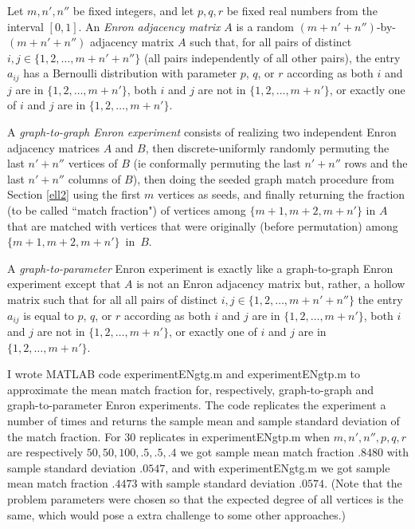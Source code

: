 \documentclass[12pt]{article}
\begin{document}
Let $m,n',n''$ be fixed integers, and let $p,q,r$ be fixed real numbers
from the interval $[0,1]$. An {\it Enron adjacency matrix} $A$ is a
random $(m+n'+n'')$-by-$(m+n'+n'')$ adjacency matrix $A$ such that, for
all pairs of distinct $i,j \in \{ 1,2,\ldots,m+n'+n''\}$
(all pairs independently of all other pairs), the entry
$a_{ij}$ has a Bernoulli distribution with parameter $p$, $q$, or $r$
according as both $i$ and $j$ are in $\{ 1,2,\ldots,m+n'\}$,
both $i$ and $j$ are not in $\{ 1,2,\ldots,m+n'\}$, or exactly one of $i$ and $j$
are in $\{ 1,2,\ldots,m+n'\}$.

A {\it graph-to-graph Enron experiment} consists
of realizing two independent Enron adjacency matrices $A$ and $B$, then  discrete-uniformly randomly permuting the last $n'+n''$ vertices of $B$
(ie conformally permuting the last $n'+n''$ rows and the last $n'+n''$
columns of $B$), then doing the seeded graph match procedure from
Section \ref{ell2} using the first $m$ vertices as seeds, and finally
returning the fraction (to be called ``match fraction")
of vertices among $\{ m+1,m+2,m+n' \}$ in $A$
that are matched with vertices that were originally (before permutation)
among $\{ m+1,m+2,m+n' \}$~in~$B$.


A {\it graph-to-parameter} Enron experiment is exactly like a
graph-to-graph Enron experiment except that $A$ is not an Enron
adjacency matrix but, rather, a hollow matrix such that for all
 all pairs of distinct $i,j \in \{ 1,2,\ldots,m+n'+n''\}$
the entry $a_{ij}$ is equal to $p$, $q$, or $r$
according as both $i$ and $j$ are in $\{ 1,2,\ldots,m+n'\}$,
both $i$ and $j$ are not in $\{ 1,2,\ldots,m+n'\}$, or exactly one of $i$ and $j$
are in $\{ 1,2,\ldots,m+n'\}$.

I wrote MATLAB code experimentENgtg.m and experimentENgtp.m to approximate
the mean match fraction for, respectively, graph-to-graph and
graph-to-parameter Enron experiments. The code replicates the experiment
a number of times and returns the sample mean and sample
standard deviation of the match fraction. For 30
replicates in experimentENgtp.m when $m,n',n'',p,q,r$ are respectively
$50,50,100,.5,.5,.4$ we got sample mean match fraction
$.8480$ with sample standard deviation
$.0547$, and with experimentENgtg.m we got sample mean match fraction
$.4473$ with sample standard deviation $.0574$. (Note that the problem
parameters were chosen so that the expected degree of all vertices is the
same, which would pose a extra challenge to some other approaches.)
\end{document}
